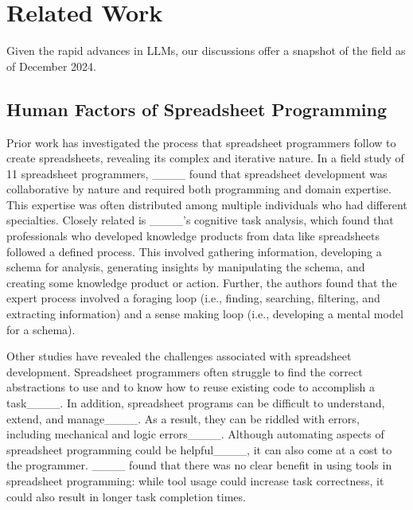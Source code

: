 \section{Related Work}
Given the rapid advances in LLMs, our discussions offer a snapshot of the field as of December 2024.

\subsection{Human Factors of Spreadsheet Programming}
\label{sec:human-factors-of-spreadsheet-programming}
Prior work has investigated the process that spreadsheet programmers follow to create spreadsheets, revealing its complex and iterative nature.
In a field study of 11 spreadsheet programmers, ____ found that spreadsheet development was collaborative by nature and required both programming and domain expertise.
This expertise was often distributed among multiple individuals who had different specialties.
Closely related is ____'s cognitive task analysis, which found that professionals who developed knowledge products from data like spreadsheets followed a defined process.
This involved gathering information, developing a schema for analysis, generating insights by manipulating the schema, and creating some knowledge product or action.
Further, the authors found that the expert process involved a foraging loop (i.e., finding, searching, filtering, and extracting information) and a sense making loop (i.e., developing a mental model for a schema).

Other studies have revealed the challenges associated with spreadsheet development.
Spreadsheet programmers often struggle to find the correct abstractions to use and to know how to reuse existing code to accomplish a task____.
In addition, spreadsheet programs can be difficult to understand, extend, and manage____. 
As a result, they can be riddled with errors, including mechanical and logic errors____.
Although automating aspects of spreadsheet programming could be helpful____, it can also come at a cost to the programmer.
____ found that there was no clear benefit in using tools in spreadsheet programming: while tool usage could increase task correctness, it could also result in longer task completion times.


